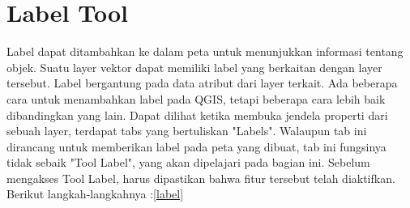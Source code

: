 \section{Label Tool}
Label dapat ditambahkan ke dalam peta untuk menunjukkan informasi tentang objek. Suatu layer vektor dapat memiliki label yang berkaitan dengan layer tersebut. Label bergantung pada data atribut dari layer terkait.
Ada beberapa cara untuk menambahkan label pada QGIS, tetapi beberapa cara lebih baik dibandingkan yang lain. Dapat dilihat ketika membuka jendela properti dari sebuah layer, terdapat tabs yang bertuliskan "Labels". Walaupun tab ini dirancang untuk memberikan label pada peta yang dibuat, tab ini fungsinya tidak sebaik "Tool Label", yang akan dipelajari pada bagian ini. Sebelum mengakses Tool Label, harus dipastikan bahwa fitur tersebut telah diaktifkan. Berikut langkah-langkahnya :\ref{label}
